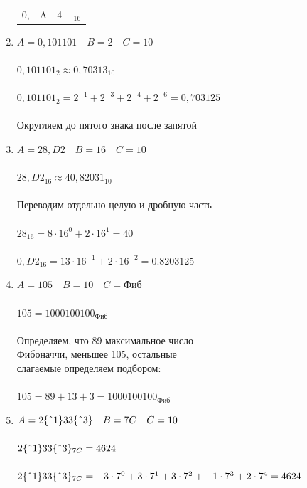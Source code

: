 \documentclass[11pt]{article}
\begin{document}
\begin{paracol}{2}
\begin{enumerate}
\begin{tabular}{c|c|c|@{}l}
    0, & A & 4 & $\,_{16}$\\
    \cline{2-3}
    \end{tabular}
    \item$A = 0,101101\quad B = 2\quad C = 10$
    \\\\
    $0,101101_2 \approx 0,70313_{10}$
    \\\\
    $0,101101_{2} = 2^{-1} + 2^{-3} + 2^{-4} + 2^{-6} = 0,703125$
    \\\\
    Округляем до пятого знака после запятой
    \item$A = 28,D2\quad B = 16\quad C = 10$
    \\\\
    $28,D2_{16} \approx 40,82031_{10}$
    \\\\
    Переводим отдельно целую и дробную часть
    \\\\
    $28_{16} = 8 \cdot 16^0 + 2 \cdot 16^1 = 40$
    \\\\
    $0,D2_{16} = 13 \cdot 16^{-1} + 2 \cdot 16^{-2} = 0.8203125$
    \item$A = 105\quad B = 10\quad C = \text{Фиб}$
    \\\\
    $105 = 1000100100_{\text{Фиб}}$
    \\\\
    Определяем, что 89 максимальное число\\ Фибоначчи, меньшее 105, остальные\\ слагаемые определяем подбором:
    \\\\
    $105 = 89 + 13 + 3 = 1000100100_{\text{Фиб}}$
    \item$A = 2\{\string^1\}33\{\string^3\}\quad B = 7C\quad C = 10$
    \\\\
    $2\{\string^1\}33\{\string^3\}_{7C} =4624$
    \\\\
    $2\{\string^1\}33\{\string^3\}_{7C} = -3 \cdot 7^0 + 3 \cdot 7^1
    + 3 \cdot 7^2 + -1 \cdot 7^3 + 2 \cdot 7^4 = 4624$
    \\\\
    
\end{enumerate}
\end{paracol}
\end{document}
